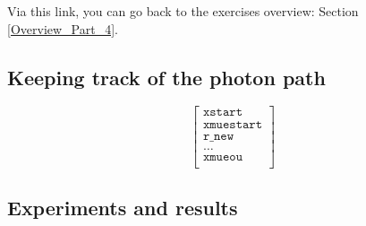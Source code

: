 \documentclass[../main/main.tex]{subfiles}
\begin{document}
\vspace{0.7cm}
Via this link, you can go back to the exercises overview: Section \underline{\ref{Overview_Part_4}}.

\subsection{Keeping track of the photon path}
\begin{equation}
\left[
\begin{matrix}
\texttt{xstart} \\
\texttt{xmuestart} \\
\texttt{r\_new} \\
\hdots \\
\texttt{xmueou} \\
\end{matrix}
\right]
\end{equation}


\newpage
\subsection{Experiments and results}
\label{Dual_line_experiments_results}
\end{document}

